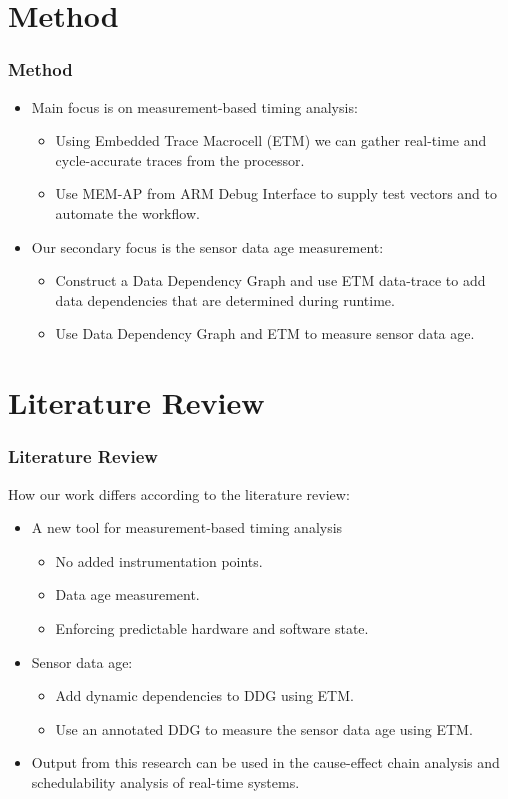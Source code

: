 \documentclass{beamer}
\begin{document}
\section{Method}
\begin{frame}
    \frametitle{Method}
    \begin{itemize}
        \item Main focus is on measurement-based timing analysis:
            \begin{itemize}
                \item Using Embedded Trace Macrocell (ETM) we can gather
                    real-time and cycle-accurate traces from the processor.
                \item Use MEM-AP from ARM Debug Interface to supply test
                    vectors and to automate the workflow.
            \end{itemize}
        \item Our secondary focus is the sensor data age measurement:
            \begin{itemize}
                \item Construct a Data Dependency Graph and use ETM data-trace to
                    add data dependencies that are determined during runtime.
                \item Use Data Dependency Graph and ETM to measure sensor data
                    age.
            \end{itemize}
            \nocite{macrocell2007etmv1}
    \end{itemize}
\end{frame}
\section{Literature Review}
\begin{frame}
    \frametitle{Literature Review}
    How our work differs according to the literature review:
    \begin{itemize}
        \item A new tool for measurement-based timing analysis
            \begin{itemize}
                \item No added instrumentation points.
                \item Data age measurement.
                \item Enforcing predictable hardware and software state.
            \end{itemize}
        \item Sensor data age:
            \begin{itemize}
                \item Add dynamic dependencies to DDG using ETM.
                \item Use an annotated DDG to measure the sensor data age
                    using ETM.
            \end{itemize}
        \item Output from this research can be used in the cause-effect chain
            analysis and schedulability analysis of real-time systems.
    \end{itemize}
\end{frame}
\end{document}
